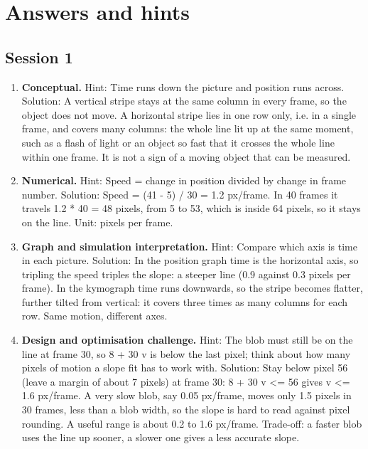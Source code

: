 \documentclass[11pt,a4paper]{article}
\begin{document}
\section{Answers and hints}

\subsection*{Session 1}
\begin{enumerate}[nosep]
\item \textbf{Conceptual.} Hint: Time runs down the picture and position runs across. Solution: A vertical stripe stays at the same column in every frame, so the object does not move. A horizontal stripe lies in one row only, i.e. in a single frame, and covers many columns: the whole line lit up at the same moment, such as a flash of light or an object so fast that it crosses the whole line within one frame. It is not a sign of a moving object that can be measured.
\item \textbf{Numerical.} Hint: Speed = change in position divided by change in frame number. Solution: Speed = (41 - 5) / 30 = 1.2 px/frame. In 40 frames it travels 1.2 * 40 = 48 pixels, from 5 to 53, which is inside 64 pixels, so it stays on the line. Unit: pixels per frame.
\item \textbf{Graph and simulation interpretation.} Hint: Compare which axis is time in each picture. Solution: In the position graph time is the horizontal axis, so tripling the speed triples the slope: a steeper line (0.9 against 0.3 pixels per frame). In the kymograph time runs downwards, so the stripe becomes flatter, further tilted from vertical: it covers three times as many columns for each row. Same motion, different axes.
\item \textbf{Design and optimisation challenge.} Hint: The blob must still be on the line at frame 30, so 8 + 30 v is below the last pixel; think about how many pixels of motion a slope fit has to work with. Solution: Stay below pixel 56 (leave a margin of about 7 pixels) at frame 30: 8 + 30 v \textless{}= 56 gives v \textless{}= 1.6 px/frame. A very slow blob, say 0.05 px/frame, moves only 1.5 pixels in 30 frames, less than a blob width, so the slope is hard to read against pixel rounding. A useful range is about 0.2 to 1.6 px/frame. Trade-off: a faster blob uses the line up sooner, a slower one gives a less accurate slope.
\end{enumerate}
\end{document}
